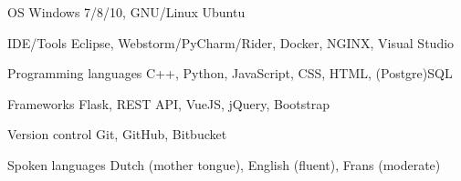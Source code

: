 
\begin{cvskills}

    \cvskill
        {OS} %
        {Windows 7/8/10, GNU/Linux Ubuntu} %
    
    \cvskill
        {IDE/Tools} %
        {Eclipse, Webstorm/PyCharm/Rider, Docker, NGINX, Visual Studio} %
    
    \cvskill
        {Programming languages} %
        {C++, Python, JavaScript, CSS, HTML, (Postgre)SQL} %

    \cvskill
        {Frameworks} %
        {Flask, REST API, VueJS, jQuery, Bootstrap} %
    
    \cvskill
        {Version control} %
        {Git, GitHub, Bitbucket} %
    
    \cvskill
        {Spoken languages} %
        {Dutch (mother tongue), English (fluent), Frans (moderate)} %
    
\end{cvskills}
